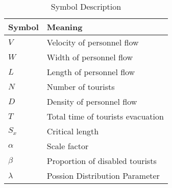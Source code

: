 
\begin{table}[H]
\centering
\caption{Symbol Description}
\begin{tabular}{p{3cm}<{\centering}p{10cm}}
\toprule[2pt]

Symbol & Meaning\\
\hline
$V$ & Velocity of personnel flow \\
$W$ & Width of personnel flow \\
$L$ & Length of personnel flow\\
$N$ & Number of tourists \\
$D$ & Density of personnel flow\\
$T$ & Total time of tourists evacuation\\
$S_x$ & Critical length\\
$\alpha$ & Scale factor \\
$\beta$ & Proportion of disabled tourists\\
$\lambda$ & Possion Distribution Parameter\\
 \bottomrule[2pt]
\end{tabular}
\end{table}